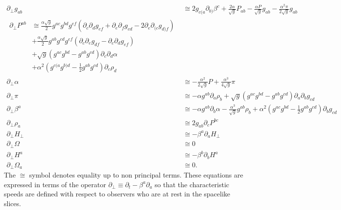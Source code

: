 \documentclass[letterpaper,nofootinbib,prd,amsmath,onecolumn]{revtex4-1}
\begin{document}
\begin{subequations}\label{principal hamilton}
\begin{align}
\partial_{\perp}g_{ab} &\cong 2g_{c(a}\partial_{b)}\beta^{c} + \frac{2\alpha}{\sqrt{g}}P_{ab} - \frac{\alpha P}{\sqrt{g}}g_{ab} - \frac{\alpha^{2}\pi}{2\sqrt{g}}g_{ab}\\
\begin{split}
\partial_{\perp}P^{ab} &\cong \frac{\alpha\sqrt{g}}{2}g^{ac}g^{bd}g^{ef}\left(\partial_{c}\partial_{d}g_{ef} + \partial_{e}\partial_{f}g_{cd} - 2\partial_{e}\partial_{(c}g_{d)f}\right)\\
& + \frac{\alpha\sqrt{g}}{2}g^{ab}g^{cd}g^{ef}\left(\partial_{c}\partial_{e}g_{df} - \partial_{c}\partial_{d}g_{ef}\right)\\
& + \sqrt{g}\left(g^{ac}g^{bd} - g^{ab}g^{cd}\right)\partial_{c}\partial_{d}\alpha\\
& + \alpha^{2}\left(g^{c(a}g^{b)d} - \frac{1}{2}g^{ab}g^{cd}\right)\partial_{c}\rho_{d}
\end{split}\\
\partial_{\perp}\alpha & \cong -\frac{\alpha^{2}}{2\sqrt{g}}P + \frac{\alpha^{3}}{4\sqrt{g}}\pi\\
\partial_{\perp}\pi & \cong -\alpha g^{ab}\partial_{a}\rho_{b} + \sqrt{g}\left(g^{ac}g^{bd} - g^{ab}g^{cd}\right)\partial_{a}\partial_{b}g_{cd}\\
\partial_{\perp}\beta^{a} & \cong -\alpha g^{ab}\partial_{b}\alpha - \frac{\alpha^{3}}{\sqrt{g}}g^{ab}\rho_{b} + \alpha^{2}\left(g^{ac}g^{bd} - \frac{1}{2}g^{ab}g^{cd}\right)\partial_{b}g_{cd}\\
\partial_{\perp}\rho_{a} & \cong 2g_{ab}\partial_{c}P^{bc}\\
\partial_{\perp}H_{\perp} & \cong - \beta^{a}\partial_{a}H_{\perp}\\
\partial_{\perp}\Omega & \cong 0\\
\partial_{\perp}H^{a} & \cong - \beta^{b}\partial_{b}H^{a}\\
\partial_{\perp}\Omega_{a} & \cong 0.
\end{align}
\end{subequations}
The $\cong$ symbol denotes equality up to non principal terms. These equations are expressed in terms of the operator $\partial_{\perp} \equiv \partial_{t} - \beta^{a}\partial_{a}$ so that the characteristic speeds are defined with respect to observers who are at rest in the spacelike slices. 
\end{document}
